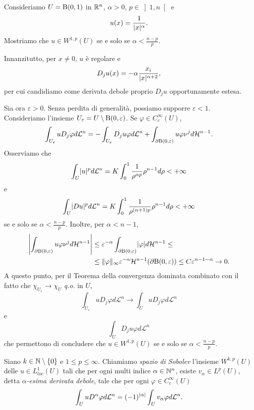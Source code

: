 \begin{esempio}\label{Esempiopalla}
	Consideriamo $U= \textup{B}(0,1)$ in $\R^n$, $\alpha > 0$, $p \in \left]
	1,n\right[$ e 
	\[ u(x)=\frac{1}{\abs{x}^\alpha}. \]
	Mostriamo che $u \in W^{1,p}(U)$ se e solo se $\alpha < \frac{n-p}{p}$.
	
	Innanzitutto, per $x \ne 0$, $u$ è regolare e 
	\[ D_ju(x) = -\alpha\frac{x_i}{\abs{x}^{\alpha+2}}, \]
	per cui candidiamo come derivata debole proprio $D_ju$ opportunamente estesa.
	
	Sia ora $\varepsilon > 0$. Senza perdita di generalità, possiamo supporre $\varepsilon < 1$. Consideriamo l'insieme $U_{\varepsilon} = U\setminus \textup{B}(0,\varepsilon) $. Se $\varphi \in C^\infty_{c}(U)$,
	\[ \int_{U_{\varepsilon}} uD_j\varphi d\mathcal{L}^n = - \int_{U_{\varepsilon}} D_ju \varphi d\mathcal{L}^n + \int_{\partial\textup{B}(0,\varepsilon)} u\varphi \nu^j d\mathcal{H}^{n-1}. \]
	Osserviamo che 
	\[ \int_{U} \abs{u}^pd\mathcal{L}^n = K \int_{0}^{1}\frac{1}{\rho^{\alpha p}}\rho^{n-1}d\rho < +\infty \]
	e 
	\[ \int_{U} \abs{Du}^pd\mathcal{L}^n = K \int_{0}^{1}\frac{1}{\rho^{(\alpha+1) p}}\rho^{n-1}d\rho < +\infty \]
	se e solo se $\alpha < \frac{n-p}{p}$. 
	Inoltre, per $\alpha < n-1$, 
	\begin{align*}
		\abs*{\int_{\partial\textup{B}(0,\varepsilon)} u\varphi \nu^j d\mathcal{H}^{n-1}} &\le \varepsilon^{-\alpha}\int_{\partial\textup{B}(0,\varepsilon)} \abs{\varphi} d\mathcal{H}^{n-1} \le \\
		&\le \norm{\varphi}_{\infty}\varepsilon^{-\alpha}\mathcal{H}^{n-1}(\partial\textup{B}(0,\varepsilon)) \le C \varepsilon^{n-1-\alpha} \to 0.
	\end{align*} 
	A questo punto, per il Teorema della convergenza dominata combinato con il fatto che $\chi_{U_{\varepsilon}} \to \chi_{U}$ \emph{q.o.} in $U$,
	\[ \int_{U_{\varepsilon}} uD_j\varphi d\mathcal{L}^n \to  \int_{U} uD_j\varphi d\mathcal{L}^n \]
	e 
	\[ \int_{U} D_ju \varphi d\mathcal{L}^n \]
	che permettono di concludere che $u \in W^{1,p}(U)$ se e solo se $\alpha < \frac{n-p}{p}$.
\end{esempio}

\begin{definizione}
	Siano $k \in \N\setminus\left\lbrace 0\right\rbrace $ e $1\le p \le \infty$. Chiamiamo \emph{spazio di Sobolev} l'insieme $W^{k,p}(U)$ delle $u \in L^1_{loc}(U)$ tali che per ogni multi indice $\alpha \in \N^n$, esiste $v_{\alpha} \in L^p(U)$, detta \emph{$\alpha$-esima derivata debole}, tale che per ogni $\varphi \in C^\infty_c(U)$
	\[ \int_{U}uD^\alpha\varphi d\mathcal{L}^n = (-1)^{\abs{\alpha}}\int_{U}v_{\alpha}\varphi d\mathcal{L}^n. \]
\end{definizione}

